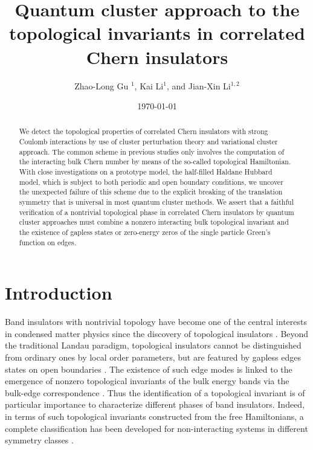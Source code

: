 \documentclass[12pt]{iopart}
\begin{document}
\title[Topological invariants in correlated Chern insulators]{Quantum cluster approach to the topological invariants in correlated Chern insulators}

\author{Zhao-Long Gu $^1$, Kai Li$^1$, and Jian-Xin Li$^{1,2}$}
\address{$^1$ National Laboratory of Solid State Microstructures and Department of Physics, Nanjing University, Nanjing 210093, China}
\address{$^2$ Collaborative Innovation Center of Advanced Microstructures, Nanjing University, Nanjing 210093, China}
\date{\today}

\begin{abstract}
\par We detect the topological properties of correlated Chern insulators with strong Coulomb interactions by use of cluster perturbation theory and variational cluster approach. The common scheme in previous studies only involves the computation of the interacting bulk Chern number by means of the so-called topological Hamiltonian. With close investigations on a prototype model, the half-filled Haldane Hubbard model, which is subject to both periodic and open boundary conditions, we uncover the unexpected failure of this scheme due to the explicit breaking of the translation symmetry that is universal in most quantum cluster methods. We assert that a faithful verification of a nontrivial topological phase in correlated Chern insulators by quantum cluster approaches must combine a nonzero interacting bulk topological invariant and the existence of gapless states or zero-energy zeros of the single particle Green's function on edges.

\end{abstract}

\submitto{\NJP}
\maketitle

\section{Introduction}

\par Band insulators with nontrivial topology have become one of the central interests in condensed matter physics since the discovery of topological insulators \cite{HK_RMP2010,QZ_RMP2011}. Beyond the traditional Landau paradigm, topological insulators cannot be distinguished from ordinary ones by local order parameters, but are featured by gapless edges states on open boundaries \cite{H_PRL1988,K_PU2001,KM_PRL2005,BHZ_S2006,LYGJ_PRB2016,LGLW_NJP2017}. The existence of such edge modes is linked to the emergence of nonzero topological invariants of the bulk energy bands via the bulk-edge correspondence \cite{QWZ_PRB2006}. Thus the identification of a topological invariant is of particular importance to characterize different phases of band insulators. Indeed, in terms of such topological invariants constructed from the free Hamiltonians, a complete classification has been developed for non-interacting systems in different symmetry classes \cite{SRFL_PRB2008}.
\end{document}
